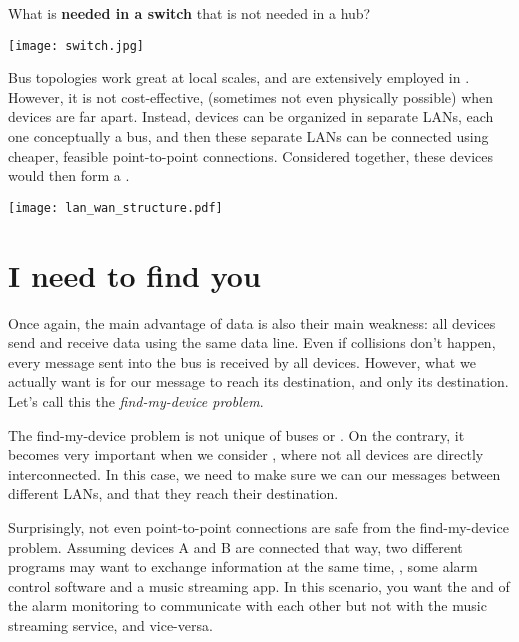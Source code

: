\begin{exercise}
What is \textbf{needed in a switch} that is not needed in a hub?

\begin{center}
\texttt{[image: switch.jpg]}
\end{center}
\end{exercise}

Bus topologies work great at local scales, and are extensively employed in
. However, it is not cost-effective,
(sometimes not even physically possible) when devices are far apart.
% 
Instead, devices can be organized in separate LANs, each one conceptually a bus, 
and then these separate LANs can be connected using cheaper, feasible point-to-point
connections. Considered together, these devices would then form a 
.

\begin{center}
\texttt{[image: lan\_wan\_structure.pdf]}
\end{center}


\section{I need to find you}\label{sec:where:addresses}

Once again, the main advantage of data  is also their main weakness: 
all devices send and receive data using the same data line. 
Even if collisions don't happen, every message sent into the bus is 
received by all devices.
However, what we actually want is for our message to reach its destination, 
and only its destination. Let's call this the \textit{find-my-device problem}.

The find-my-device problem is not unique of buses or . On the contrary, it becomes 
very important when we consider , where not all devices are directly interconnected.
In this case, we need to make sure we can  our messages
between different LANs, and that they reach their destination.

Surprisingly, not even point-to-point connections are safe from the find-my-device problem.
Assuming devices A and B are connected that way, two different programs may want to 
exchange information at the same time, \eg, some alarm control software and 
a music streaming app. 
In this scenario, you want the  and  of the alarm monitoring 
 to communicate with each other but not with the music streaming service, 
and vice-versa.

